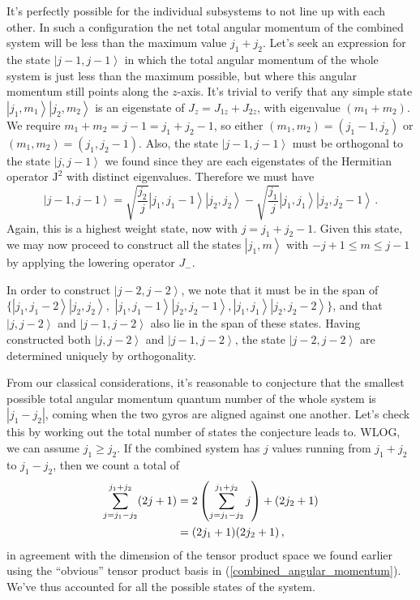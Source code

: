 \documentclass{article}
\theoremstyle{plain}\theoremheaderfont{\normalfont\itshape}\theorembodyfont{\rmfamily}\theoremseparator{.}\newtheorem*{rem}{Remark}\newtheorem*{ex}{Example}\newtheorem*{proof}{Proof}\newtheorem*{altp}{Alternative proof}
\theoremstyle{plain}\theoremheaderfont{\normalfont\bfseries}\theorembodyfont{\rmfamily}\theoremseparator{.}\newtheorem{thm}{Theorem}[section]\newtheorem{lem}[thm]{Lemma}\newtheorem{prop}[thm]{Proposition}\newtheorem*{cor}{Corollary}\newtheorem{defn}[thm]{Definition}\newtheorem{clm}[thm]{Claim}\newtheorem{clminproof}{Claim}
\theoremstyle{break}\theoremheaderfont{\normalfont\itshape}\theorembodyfont{\rmfamily}\theoremseparator{.\medskip}\newtheorem*{proofskip}{Proof}\newtheorem*{exs}{Examples}\newtheorem*{rems}{Remarks}
\theoremstyle{break}\theoremheaderfont{\normalfont\bfseries}\theorembodyfont{\rmfamily}\theoremseparator{.\medskip}\newtheorem{lemskip}[thm]{Lemma}\newtheorem{defnskip}[thm]{Definition}\newtheorem{propskip}[thm]{Proposition}\newtheorem{thmskip}[thm]{Theorem}
\numberwithin{equation}{section}
\newcommand{\ket}[1]{\left| #1 \right\rangle}
\newcommand{\vb}[1]{\bm{\mathrm{#1}}}
\newcommand{\abs}[1]{\left| #1 \right|}
\begin{document}
    It's perfectly possible for the individual subsystems to not line up with each other. In such a configuration the net total angular momentum of the combined system will be less than the maximum value \(j_1+j_2\). Let's seek an expression for the state \(\ket{j-1,j-1}\) in which the total angular momentum of the whole system is just less than the maximum possible, but where this angular momentum still points along the \(z\)-axis. It's trivial to verify that any simple state \(\ket{j_1,m_1}\ket{j_2,m_2}\) is an eigenstate of \(J_z=J_{1z}+J_{2z}\), with eigenvalue \((m_1+m_2)\). We require \(m_1+m_2=j-1= j_1+j_2-1\), so either \((m_1,m_2)=(j_1-1,j_2)\) or \((m_1,m_2)=(j_1,j_2-1)\). Also, the state \(\ket{j-1,j-1}\) must be orthogonal to the state \(\ket{j,j-1}\) we found since they are each eigenstates of the Hermitian operator \(\vb{J}^2\) with distinct eigenvalues. Therefore we must have
    \begin{equation}
        \ket{j-1,j-1}=\sqrt{\frac{j_2}{j}}\ket{j_1,j_1-1}\ket{j_2,j_2}-\sqrt{\frac{j_1}{j}}\ket{j_1,j_1}\ket{j_2,j_2-1}\,.
    \end{equation}
    Again, this is a highest weight state, now with \(j=j_1+j_2-1\). Given this state, we may now proceed to construct all the states \(\ket{j_1,m}\) with \(-j+1\le m\le j-1\) by applying the lowering operator \(J_-\).

    In order to construct \(\ket{j-2,j-2}\), we note that it must be in the span of \(\{\ket{j_1,j_1-2}\ket{j_2,j_2},\) \(\ket{j_1,j_1-1}\ket{j_2,j_2-1}, \ket{j_1,j_1}\ket{j_2,j_2-2}\}\), and that \(\ket{j,j-2}\) and \(\ket{j-1,j-2}\) also lie in the span of these states. Having constructed both \(\ket{j,j-2}\) and \(\ket{j-1,j-2}\), the state \(\ket{j-2,j-2}\) are determined uniquely by orthogonality.

    From our classical considerations, it's reasonable to conjecture that the smallest possible total angular momentum quantum number of the whole system is \(\abs{j_1-j_2}\), coming when the two gyros are aligned against one another. Let's check this by working out the total number of states the conjecture leads to. WLOG, we can assume \(j_1\ge j_2\). If the combined system has \(j\) values running from \(j_1+j_2\) to \(j_1-j_2\), then we count a total of
    \begin{align}
        \sum_{j=j_1-j_2}^{j_1+j_2}(2j+1)&=2\left(\sum_{j=j_1-j_2}^{j_1+j_2}j\right)+(2j_2+1)\notag\\
        &=(2j_1+1)(2j_2+1)\,,
    \end{align}
    in agreement with the dimension of the tensor product space we found earlier using the ``obvious'' tensor product basis in (\ref{combined_angular_momentum}). We've thus accounted for all the possible states of the system.
\end{document}
